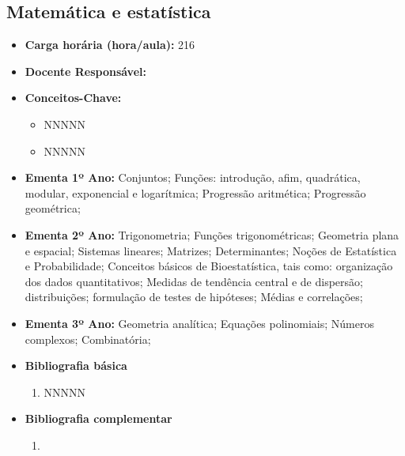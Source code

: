 \documentclass[11pt,fleqn]{book} %
\begin{document}
\newpage
\subsection{Matemática e estatística}\label{disc:matematica}
\begin{itemize}
	\item \textbf{Carga horária (hora/aula):} 216
	\item \textbf{Docente Responsável:}
	\item \textbf{Conceitos-Chave:}
	\begin{itemize}
		\item NNNNN
		\item NNNNN
	\end{itemize}
	\item \textbf{Ementa 1º Ano:} 
	Conjuntos;
	Funções: introdução, afim, quadrática, modular, exponencial e logarítmica;
	Progressão aritmética;
	Progressão geométrica;
	\item \textbf{Ementa 2º Ano:} 
	Trigonometria;
	Funções trigonométricas;
	Geometria plana e espacial;
	Sistemas lineares;
	Matrizes;
	Determinantes;
	Noções de Estatística e Probabilidade;
	Conceitos básicos de Bioestatística, tais como: organização dos dados quantitativos;
	Medidas de tendência central e de dispersão; distribuições; formulação de testes de hipóteses; 
	Médias e correlações;	
	\item \textbf{Ementa 3º Ano:} 
	Geometria analítica; 
	Equações polinomiais; 
	Números complexos; 
	Combinatória; 

	\item \textbf{Bibliografia básica}
	\begin{enumerate}
		\item NNNNN
	\end{enumerate}
	\item \textbf{Bibliografia complementar}
	\begin{enumerate}
		\item 
	\end{enumerate}	
\end{itemize}


\newpage
\end{document}
